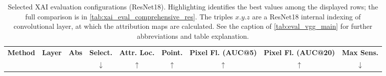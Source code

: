 \begin{table}[htb!]
    \centering
    \small
    \caption{Selected XAI evaluation configurations (ResNet18). Highlighting identifies the best values among the displayed rows; the full comparison is in \cref{tab:xai_eval_comprehensive_res}. The triples $x.y.z$ are a ResNet18 internal indexing of convolutional layer, at which the attribution maps are calculated. See the caption of \cref{tab:eval_vgg_main} for further abbreviations and table explanation.}
    \label{tab:eval_res_main}
    \begin{tabular}{p{4cm}|cc|cccccc}
        \toprule
        \textbf{Method} & \textbf{Layer} & \textbf{Abs} & \textbf{Select.} & \textbf{Attr. Loc.} & \textbf{Point.} & \textbf{Pixel Fl. (AUC@5)} & \textbf{Pixel Fl. (AUC@20)} & \textbf{Max Sens.} \\
         & & & \textbf{$\downarrow$} & \textbf{$\uparrow$} & \textbf{$\uparrow$} & \textbf{$\uparrow$} & \textbf{$\uparrow$} & \textbf{$\downarrow$} \\
        

\end{tabular}
\end{table}
